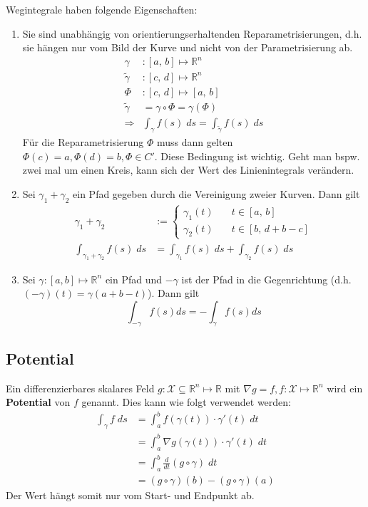 \documentclass[a4paper,10pt]{article}
\def\R{\mathbb{R}}
\def\X{\mathcal{X}}
\begin{document}
Wegintegrale haben folgende Eigenschaften:
\begin{enumerate}
  \item Sie sind unabhängig von orientierungserhaltenden Reparametrisierungen, d.h. sie hängen nur vom Bild der Kurve und nicht von der Parametrisierung ab. 
  \begin{align*}
    \gamma&: [a,\, b] \mapsto \R^n\\
    \tilde{\gamma}&: [c,\, d] \mapsto \R^n\\
    \varPhi&: [c, \, d] \mapsto [a, \, b]\\
    \tilde{\gamma} &= \gamma \circ \varPhi = \gamma(\varPhi)\\
    \Rightarrow &\int_\gamma f(s) \; ds = \int_{\tilde{\gamma}} f(s) \; ds
  \end{align*}
  Für die Reparametrisierung $\varPhi$ muss dann gelten $\varPhi(c) = a, \varPhi(d) = b, \varPhi \in C'$. Diese Bedingung ist wichtig. Geht man bspw. zwei mal um einen Kreis, kann sich der Wert des Linienintegrals verändern.
  \item Sei \(\gamma_1 + \gamma_2\) ein Pfad gegeben durch die Vereinigung zweier Kurven. Dann gilt
  \begin{align*}
    \gamma_1 + \gamma_2 &:=
    \begin{cases}
      \gamma_1(t) \quad& t \in [a, \, b]\\
      \gamma_2(t) \quad& t \in [b, \, d + b - c]
    \end{cases}\\
    \int_{\gamma_1 + \gamma_2} f(s) \; ds &= \int_{\gamma_1} f(s) \; ds + \int_{\gamma_2} f(s)\; ds
  \end{align*}
  \item Sei \(\gamma : \left[a,b\right] \mapsto \R^n\) ein Pfad und \(-\gamma\) ist der Pfad in die Gegenrichtung (d.h. \((-\gamma)(t) = \gamma(a + b - t)\)). Dann gilt
  \[\int_{-\gamma} f(s)ds = -\int_\gamma f(s) ds\]
\end{enumerate}

\subsection{Potential}
Ein differenzierbares skalares Feld \(g: \X \subseteq \R^n \mapsto \R\) mit \(\nabla g = f, f: \X \mapsto \R^n\) wird ein \textbf{Potential} von \(f\) genannt. Dies kann wie folgt verwendet werden:
\begin{align*}
  \int_\gamma f \; ds &= \int_a^b f(\gamma(t)) \cdot \gamma'(t) \; dt\\
  &= \int_a^b \nabla g(\gamma(t)) \cdot \gamma'(t) \; dt\\
  &= \int_a^b \frac{d}{dt} (g \circ \gamma) \; dt\\
  &= (g \circ \gamma)(b) - (g \circ \gamma)(a)
\end{align*}
Der Wert hängt somit nur vom Start- und Endpunkt ab.
\end{document}
